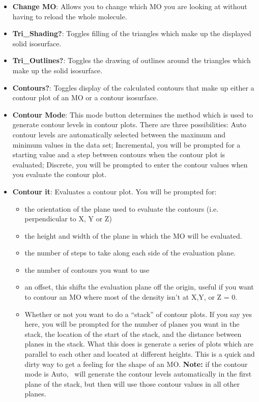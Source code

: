 \begin{itemize}
\item {\bf Change MO}:  Allows you to change which MO you are looking
at without having to reload the whole molecule.

\item {\bf Tri\_Shading?}: Toggles filling of the triangles which make
up the displayed solid isosurface.

\item {\bf Tri\_Outlines?}: Toggles the drawing of outlines around the
triangles which make up the solid isosurface.

\item {\bf Contours?}: Toggles display of the calculated contours that
make up either a contour plot of an MO or a contour isosurface.

\item {\bf Contour Mode}:  This mode button determines the method
which is used to generate contour levels in contour plots.  There are
three possibilities: {\sf Auto}  contour levels
are automatically selected between the maximum and minimum values in
the data set; {\sf Incremental}, you will be prompted for a starting
value and a step between contours when the contour plot is evaluated;
{\sf Discrete}, you will be prompted to enter the 
contour values when you evaluate the contour plot.  

\item {\bf Contour it}: Evaluates a contour plot.  You will be
prompted for:
\begin{itemize}
\item  the orientation of the plane used to evaluate the contours
(i.e. perpendicular to X, Y or Z)
\item  the height and width of the plane in which the MO will be
evaluated.
\item the number of steps to take along each side of the evaluation
plane.
\item the number of contours you want to use
\item an offset, this shifts the evaluation plane off the origin,
useful if you want to contour an MO where most of the density isn't at
X,Y, or Z = 0.
\item Whether or not you want to do a ``stack'' of contour plots.
  If you say yes here, you will be prompted for the number of planes
you want in the stack, the location of the start of the stack, and the
distance between planes in the stack.  What this does is generate a
series of plots which are parallel to each other and located at
different heights.  This is a quick and dirty way to get a feeling for
the shape of an MO.  {\bf Note:}  if the contour mode is {\sf Auto},
\viewprog\ will generate the contour levels automatically in the first
plane of the stack, but then will use those contour values in all
other planes.
\end{itemize}


\end{itemize}
